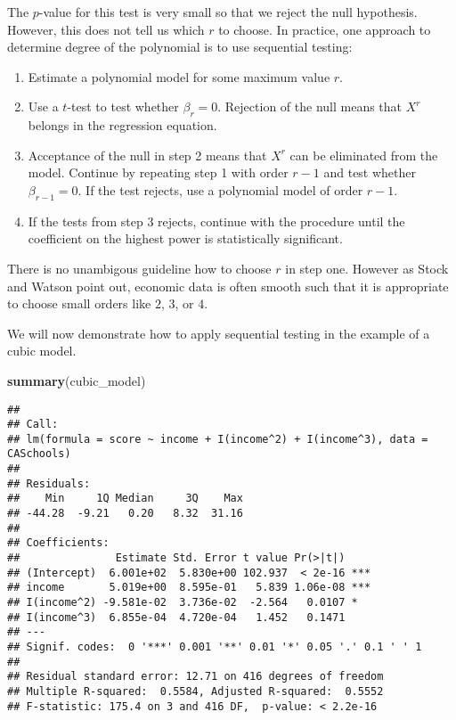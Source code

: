 \documentclass[]{book}
\newenvironment{Shaded}{\begin{snugshade}}{\end{snugshade}}
\newcommand{\KeywordTok}[1]{\textcolor[rgb]{0.13,0.29,0.53}{\textbf{#1}}}
\newcommand{\NormalTok}[1]{#1}
\providecommand{\tightlist}{%
  \setlength{\itemsep}{0pt}\setlength{\parskip}{0pt}}
\theoremstyle{definition}
\theoremstyle{definition}
\theoremstyle{definition}
\theoremstyle{remark}
\begin{document}
The \(p\)-value for this test is very small so that we reject the null
hypothesis. However, this does not tell us which \(r\) to choose. In
practice, one approach to determine degree of the polynomial is to use
sequential testing:

\begin{enumerate}
\def\labelenumi{\arabic{enumi}.}
\tightlist
\item
  Estimate a polynomial model for some maximum value \(r\).
\item
  Use a \(t\)-test to test whether \(\beta_r = 0\). Rejection of the
  null means that \(X^r\) belongs in the regression equation.
\item
  Acceptance of the null in step 2 means that \(X^r\) can be eliminated
  from the model. Continue by repeating step 1 with order \(r-1\) and
  test whether \(\beta_{r-1}=0\). If the test rejects, use a polynomial
  model of order \(r-1\).
\item
  If the tests from step 3 rejects, continue with the procedure until
  the coefficient on the highest power is statistically significant.
\end{enumerate}

There is no unambigous guideline how to choose \(r\) in step one.
However as Stock and Watson point out, economic data is often smooth
such that it is appropriate to choose small orders like \(2\), \(3\), or
\(4\).

We will now demonstrate how to apply sequential testing in the example
of a cubic model.

\begin{Shaded}
\begin{Highlighting}[]
\KeywordTok{summary}\NormalTok{(cubic_model)}
\end{Highlighting}
\end{Shaded}

\begin{verbatim}
## 
## Call:
## lm(formula = score ~ income + I(income^2) + I(income^3), data = CASchools)
## 
## Residuals:
##    Min     1Q Median     3Q    Max 
## -44.28  -9.21   0.20   8.32  31.16 
## 
## Coefficients:
##               Estimate Std. Error t value Pr(>|t|)    
## (Intercept)  6.001e+02  5.830e+00 102.937  < 2e-16 ***
## income       5.019e+00  8.595e-01   5.839 1.06e-08 ***
## I(income^2) -9.581e-02  3.736e-02  -2.564   0.0107 *  
## I(income^3)  6.855e-04  4.720e-04   1.452   0.1471    
## ---
## Signif. codes:  0 '***' 0.001 '**' 0.01 '*' 0.05 '.' 0.1 ' ' 1
## 
## Residual standard error: 12.71 on 416 degrees of freedom
## Multiple R-squared:  0.5584, Adjusted R-squared:  0.5552 
## F-statistic: 175.4 on 3 and 416 DF,  p-value: < 2.2e-16
\end{verbatim}
\end{document}
